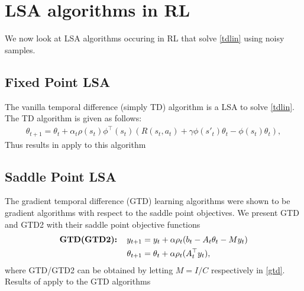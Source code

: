 \section{LSA algorithms in RL}
We now look at LSA algorithms occuring in RL that solve \eqref{tdlin} using noisy samples.
\subsection{Fixed Point LSA}
The vanilla temporal difference (simply TD) algorithm is a LSA to solve \eqref{tdlin}. The TD algorithm is given as follows:
\begin{align}\label{vtd}
\theta_{t+1}=\theta_t+\alpha_t \rho(s_t)\phi^\top(s_t)(R(s_t,a_t)+\gamma \phi(s'_t)\theta_t- \phi(s_t)\theta_t),
\end{align}
Thus results in  apply to this algorithm
\subsection{Saddle Point LSA}
The gradient temporal difference (GTD) learning algorithms were shown to be gradient algorithms with respect to the saddle point objectives. We present GTD and GTD2 with their saddle point objective functions
\begin{align}\label{gtd}
\begin{split}
\textbf{GTD(GTD2):\quad}y_{t+1}&=y_t+\alpha \rho_t(b_t-A_t\theta_t - M y_t)\\
\theta_{t+1}&=\theta_t+\alpha\rho_t(A^\top_ty_t),
\end{split}
\end{align}
where GTD/GTD2 can be obtained by letting $M=I/C$ respectively in \eqref{gtd}. Results of  apply to the GTD algorithms
